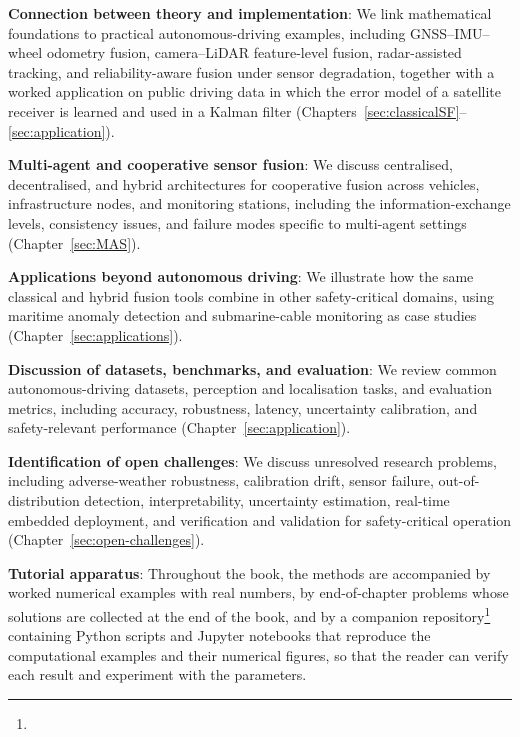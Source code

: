 \begin{list4a}
    \item \textbf{Connection between theory and implementation}: We link mathematical foundations to practical autonomous-driving examples, including GNSS--IMU--wheel odometry fusion, camera--LiDAR feature-level fusion, radar-assisted tracking, and reliability-aware fusion under sensor degradation, together with a worked application on public driving data in which the error model of a satellite receiver is learned and used in a Kalman filter (Chapters~\ref{sec:classicalSF}--\ref{sec:application}).
    \item \textbf{Multi-agent and cooperative sensor fusion}: We discuss centralised, decentralised, and hybrid architectures for cooperative fusion across vehicles, infrastructure nodes, and monitoring stations, including the information-exchange levels, consistency issues, and failure modes specific to multi-agent settings (Chapter~\ref{sec:MAS}).
    \item \textbf{Applications beyond autonomous driving}: We illustrate how the same classical and hybrid fusion tools combine in other safety-critical domains, using maritime anomaly detection and submarine-cable monitoring as case studies (Chapter~\ref{sec:applications}).
    \item \textbf{Discussion of datasets, benchmarks, and evaluation}: We review common autonomous-driving datasets, perception and localisation tasks, and evaluation metrics, including accuracy, robustness, latency, uncertainty calibration, and safety-relevant performance (Chapter~\ref{sec:application}).
    \item \textbf{Identification of open challenges}: We discuss unresolved research problems, including adverse-weather robustness, calibration drift, sensor failure, out-of-distribution detection, interpretability, uncertainty estimation, real-time embedded deployment, and verification and validation for safety-critical operation (Chapter~\ref{sec:open-challenges}).
    \item \textbf{Tutorial apparatus}: Throughout the book, the methods are accompanied by worked numerical examples with real numbers, by end-of-chapter problems whose solutions are collected at the end of the book, and by a companion repository\footnote{\repourl} containing Python scripts and Jupyter notebooks that reproduce the computational examples and their numerical figures, so that the reader can verify each result and experiment with the parameters.
\end{list4a}

